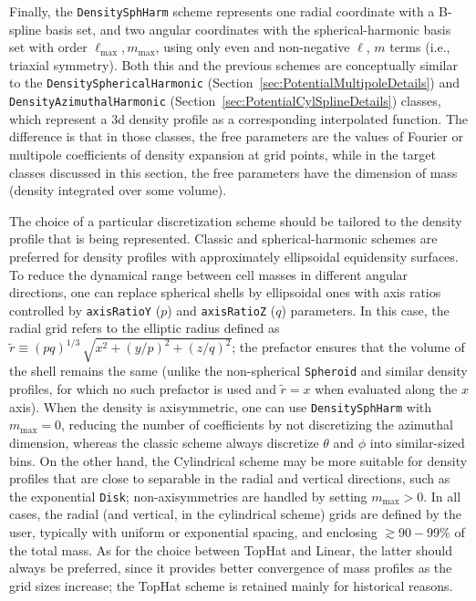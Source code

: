 \documentclass[12pt]{article}
\newcommand{\ppp}[1]{\textcolor{darkolive} {\texttt{#1}}}
\begin{document}
Finally, the \ppp{DensitySphHarm} scheme represents one radial coordinate with a B-spline basis set, and two angular coordinates with the spherical-harmonic basis set with order $\ell_\mathrm{max},m_\mathrm{max}$, using only even and non-negative $\ell$, $m$ terms (i.e., triaxial symmetry). Both this and the previous schemes are conceptually similar to the \ppp{DensitySphericalHarmonic} (Section~\ref{sec:PotentialMultipoleDetails}) and \ppp{DensityAzimuthalHarmonic} (Section~\ref{sec:PotentialCylSplineDetails}) classes, which represent a 3d density profile as a corresponding interpolated function. The difference is that in those classes, the free parameters are the values of Fourier or multipole coefficients of density expansion at grid points, while in the target classes discussed in this section, the free parameters have the dimension of mass (density integrated over some volume).

The choice of a particular discretization scheme should be tailored to the density profile that is being represented. Classic and spherical-harmonic schemes are preferred for density profiles with approximately ellipsoidal equidensity surfaces. To reduce the dynamical range between cell masses in different angular directions, one can replace spherical shells by ellipsoidal ones with axis ratios controlled by \ppp{axisRatioY} ($p$) and \ppp{axisRatioZ} ($q$) parameters. In this case, the radial grid refers to the elliptic radius defined as $\tilde r \equiv (pq)^{1/3}\,\sqrt{x^2 + (y/p)^2 + (z/q)^2}$; the prefactor ensures that the volume of the shell remains the same (unlike the non-spherical \ppp{Spheroid} and similar density profiles, for which no such prefactor is used and $\tilde r=x$ when evaluated along the $x$ axis). When the density is axisymmetric, one can use \ppp{DensitySphHarm} with $m_\mathrm{max}=0$, reducing the number of coefficients by not discretizing the azimuthal dimension, whereas the classic scheme always discretize $\theta$ and $\phi$ into similar-sized bins. On the other hand, the Cylindrical scheme may be more suitable for density profiles that are close to separable in the radial and vertical directions, such as the exponential \ppp{Disk}; non-axisymmetries are handled by setting $m_\mathrm{max}>0$. In all cases, the radial (and vertical, in the cylindrical scheme) grids are defined by the user, typically with uniform or exponential spacing, and enclosing $\gtrsim 90-99\%$ of the total mass. As for the choice between TopHat and Linear, the latter should always be preferred, since it provides better convergence of mass profiles as the grid sizes increase; the TopHat scheme is retained mainly for historical reasons.
\end{document}
